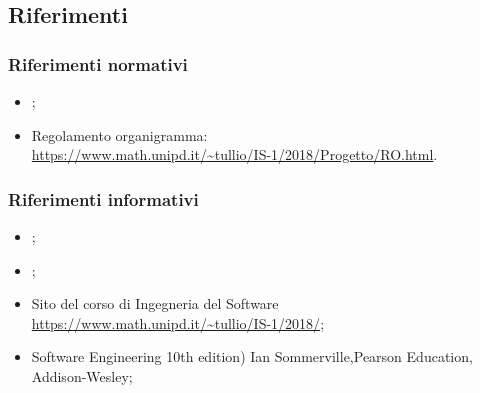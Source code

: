 \subsection{Riferimenti}
    \subsubsection {Riferimenti normativi}
        \begin{itemize}
        \item \NdP;
        \item Regolamento organigramma: \\
        \url{https://www.math.unipd.it/~tullio/IS-1/2018/Progetto/RO.html}.
        \end{itemize}
    \subsubsection {Riferimenti informativi}
        \begin{itemize}
        \item \AdR;
        \item \PdQ;
        \item Sito del corso di Ingegneria del Software \url{https://www.math.unipd.it/~tullio/IS-1/2018/};
        \item  Software Engineering 10th edition) Ian Sommerville,Pearson Education, Addison-Wesley;
    \end{itemize}